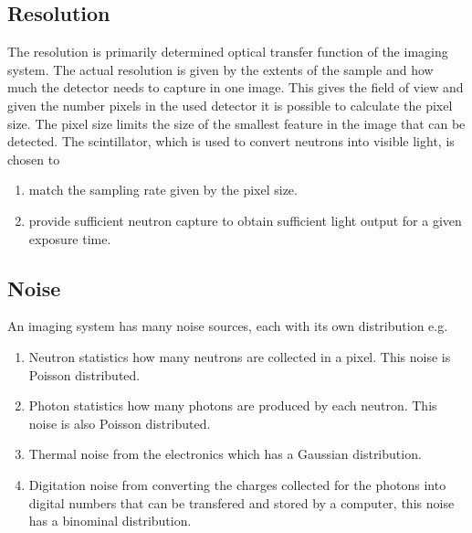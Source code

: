 \documentclass[letterpaper,10pt,english]{sphinxmanual}
\begin{document}
\subsection{Resolution}
\label{\detokenize{02-ImageEnhancement:resolution}}
\sphinxAtStartPar
The resolution is primarily determined optical transfer function of the imaging system. The actual resolution is given by the extents of the sample and how much the detector needs to capture in one image. This gives the field of view and given the number pixels in the used detector it is possible to calculate the pixel size. The pixel size limits the size of the smallest feature in the image that can be detected. The scintillator, which is used to convert neutrons into visible light, is chosen to
\begin{enumerate}
%
\item {} 
\sphinxAtStartPar
match the sampling rate given by the pixel size.

\item {} 
\sphinxAtStartPar
provide sufficient neutron capture to obtain sufficient light output for a given exposure time.

\end{enumerate}


\subsection{Noise}
\label{\detokenize{02-ImageEnhancement:noise}}
\sphinxAtStartPar
An imaging system has many noise sources, each with its own distribution e.g.
\begin{enumerate}
%
\item {} 
\sphinxAtStartPar
Neutron statistics \sphinxhyphen{} how many neutrons are collected in a pixel. This noise is Poisson distributed.

\item {} 
\sphinxAtStartPar
Photon statistics \sphinxhyphen{} how many photons are produced by each neutron. This noise is also Poisson distributed.

\item {} 
\sphinxAtStartPar
Thermal noise from the electronics which has a Gaussian distribution.

\item {} 
\sphinxAtStartPar
Digitation noise from converting the charges collected for the photons into digital numbers that can be transfered and stored by a computer, this noise has a binominal distribution.

\end{enumerate}
\end{document}
